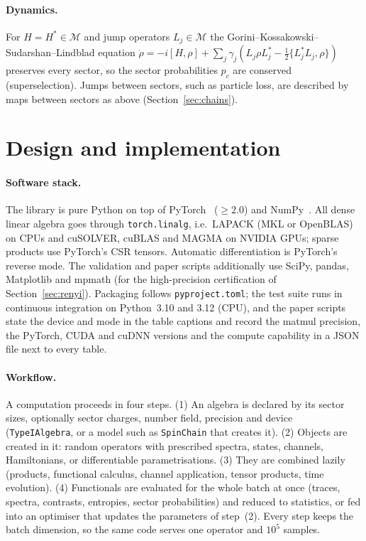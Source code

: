\documentclass[11pt]{article}
\newcommand{\M}{\mathcal{M}}
\begin{document}
\paragraph{Dynamics.} For $H=H^*\in\M$ and jump operators $L_j\in\M$ the
Gorini--Kossakowski--Sudarshan--Lindblad equation
$\dot\rho=-i[H,\rho]+\sum_j\gamma_j(L_j\rho L_j^*-\tfrac12\{L_j^*L_j,\rho\})$ preserves every sector,
so the sector probabilities $p_c$ are conserved (superselection). Jumps between sectors, such as particle loss,
are described by maps between sectors as above (Section~\ref{sec:chains}).

\section{Design and implementation}\label{sec:design}

\paragraph{Software stack.} The library is pure Python on top of PyTorch~\cite{paszke2019} ($\ge2.0$) and NumPy~\cite{harris2020}. All dense linear algebra goes through \texttt{torch.linalg}, i.e.\ LAPACK
(MKL or OpenBLAS) on CPUs and cuSOLVER, cuBLAS and MAGMA on NVIDIA GPUs; sparse products use PyTorch's CSR
tensors. Automatic differentiation is PyTorch's reverse mode. The validation and paper scripts additionally use
SciPy, pandas, Matplotlib and mpmath (for the high-precision certification of Section~\ref{sec:renyi}). Packaging follows \texttt{pyproject.toml}; the test suite runs in continuous
integration on Python~3.10 and 3.12 (CPU), and the paper scripts state the device and mode in the table captions and record the matmul precision, the
PyTorch, CUDA and cuDNN versions and the compute capability in a JSON file next to every table.

\paragraph{Workflow.} A computation proceeds in four steps. (1) An algebra is declared by its sector sizes,
optionally sector charges, number field, precision and device (\texttt{TypeIAlgebra}, or a model such as
\texttt{SpinChain} that creates it). (2) Objects are created in it: random operators with prescribed spectra,
states, channels, Hamiltonians, or differentiable parametrisations. (3) They are combined lazily (products,
functional calculus, channel application, tensor products, time evolution). (4) Functionals are evaluated for the
whole batch at once (traces, spectra, contrasts, entropies, sector probabilities) and reduced to statistics, or
fed into an optimiser that updates the parameters of step~(2). Every step keeps the batch dimension, so the same
code serves one operator and $10^5$ samples.
\end{document}
